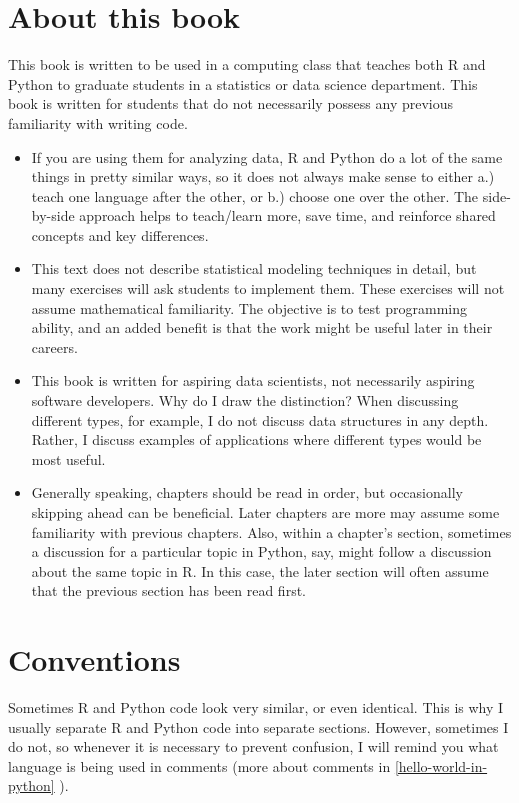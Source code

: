 \documentclass[12pt,krantz2]{krantz}
\begin{document}
\hypertarget{about-this-book}{%
\section*{About this book}\label{about-this-book}}


This book is written to be used in a computing class that teaches both R and Python to graduate students in a statistics or data science department. This book is written for students that do not necessarily possess any previous familiarity with writing code.

\begin{itemize}
\item
  If you are using them for analyzing data, R and Python do a lot of the same things in pretty similar ways, so it does not always make sense to either a.) teach one language after the other, or b.) choose one over the other. The side-by-side approach helps to teach/learn more, save time, and reinforce shared concepts and key differences.
\item
  This text does not describe statistical modeling techniques in detail, but many exercises will ask students to implement them. These exercises will not assume mathematical familiarity. The objective is to test programming ability, and an added benefit is that the work might be useful later in their careers.
\item
  This book is written for aspiring data scientists, not necessarily aspiring software developers. Why do I draw the distinction? When discussing different types, for example, I do not discuss data structures in any depth. Rather, I discuss examples of applications where different types would be most useful.
\item
  Generally speaking, chapters should be read in order, but occasionally skipping ahead can be beneficial. Later chapters are more may assume some familiarity with previous chapters. Also, within a chapter's section, sometimes a discussion for a particular topic in Python, say, might follow a discussion about the same topic in R. In this case, the later section will often assume that the previous section has been read first.
\end{itemize}

\hypertarget{conventions}{%
\section*{Conventions}\label{conventions}}


Sometimes R and Python code look very similar, or even identical. This is why I usually separate R and Python code into separate sections. However, sometimes I do not, so whenever it is necessary to prevent confusion, I will remind you what language is being used in comments (more about comments in \ref{hello-world-in-python} ).
\end{document}
